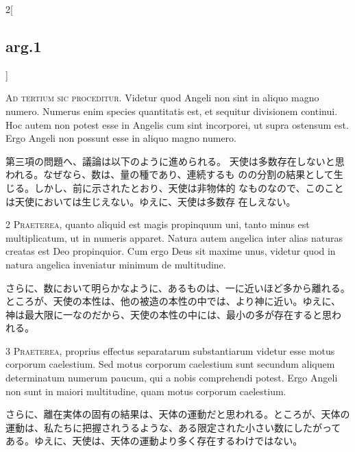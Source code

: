 \documentclass[paper=a4paper,fontsize=10pt,jafontsize=9pt,titlepage]{jlreq}
\begin{document}
\begin{paracol}{2}[\subsection{arg.1}]

{\huge A}{\scshape d tertium sic proceditur}. Videtur quod
Angeli non sint in aliquo magno numero. Numerus enim species quantitatis
est, et sequitur divisionem continui. Hoc autem non potest esse in
Angelis cum sint incorporei, ut supra ostensum est. Ergo Angeli non
possunt esse in aliquo magno numero.

\switchcolumn

第三項の問題へ、議論は以下のように進められる。
天使は多数存在しないと思われる。なぜなら、数は、量の種であり、連続するも
 のの分割の結果として生じる。しかし、前に示されたとおり、天使は非物体的
 なものなので、このことは天使においては生じえない。ゆえに、天使は多数存
 在しえない。


{\scshape 2 Praeterea}, quanto aliquid est magis
propinquum uni, tanto minus est multiplicatum, ut in numeris
apparet. Natura autem angelica inter alias naturas creatas est Deo
propinquior. Cum ergo Deus sit maxime unus, videtur quod in natura
angelica inveniatur minimum de multitudine.

\switchcolumn

さらに、数において明らかなように、あるものは、一に近いほど多から離れる。
 ところが、天使の本性は、他の被造の本性の中では、より神に近い。ゆえに、
 神は最大限に一なのだから、天使の本性の中には、最小の多が存在すると思わ
 れる。


{\scshape 3 Praeterea}, proprius effectus separatarum
substantiarum videtur esse motus corporum caelestium. Sed motus corporum
caelestium sunt secundum aliquem determinatum numerum paucum, qui a
nobis comprehendi potest. Ergo Angeli non sunt in maiori multitudine,
quam motus corporum caelestium.

\switchcolumn

さらに、離在実体の固有の結果は、天体の運動だと思われる。ところが、天体の
 運動は、私たちに把握されうるような、ある限定された小さい数にしたがって
 ある。ゆえに、天使は、天体の運動より多く存在するわけではない。


\end{paracol}
\end{document}
